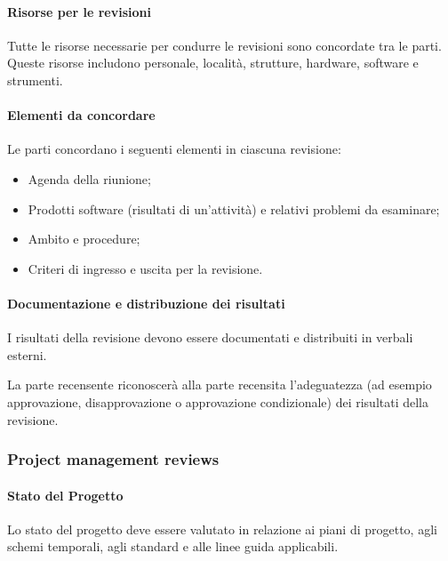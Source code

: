 \paragraph{Risorse per le revisioni}
Tutte le risorse necessarie per condurre le revisioni sono concordate tra le parti. Queste risorse includono personale, località, strutture, hardware, software e strumenti.

\paragraph{Elementi da concordare}
Le parti concordano i seguenti elementi in ciascuna revisione:
\begin{itemize}
    \item Agenda della riunione;
    \item Prodotti software (risultati di un'attività) e relativi problemi da esaminare;
    \item Ambito e procedure;
    \item Criteri di ingresso e uscita per la revisione.
\end{itemize}


\paragraph{Documentazione e distribuzione dei risultati}
I risultati della revisione devono essere documentati e distribuiti in verbali esterni.

La parte recensente riconoscerà alla parte recensita l'adeguatezza (ad esempio approvazione, disapprovazione o approvazione condizionale) dei risultati della revisione.

\subsubsection{Project management reviews}

\paragraph{Stato del Progetto}
Lo stato del progetto deve essere valutato in relazione ai piani di progetto, agli schemi temporali, agli standard e alle linee guida applicabili.

